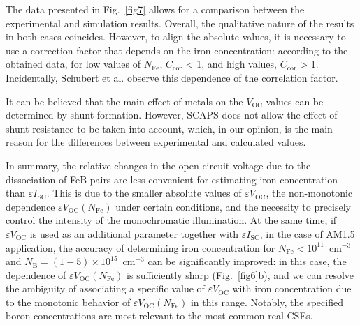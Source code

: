 \documentclass[a4paper,fleqn]{cas-sc}
\begin{document}
The data presented in Fig.~\ref{fig7} allows for a comparison between the experimental and simulation results. Overall, the qualitative nature of the results in both cases coincides. However, to align the absolute values, it is necessary to use a correction factor that depends on the iron concentration: according to the obtained data, for low values of $N_\mathrm{Fe}$, $C_\mathrm{cor}$ < 1, and high values, $C_\mathrm{cor}$ > 1. Incidentally, Schubert et al. \cite{IronSC} observe this dependence of the correlation factor.

It can be believed \cite{YangHandbookPVSi} that the main effect of metals on the $V_\mathrm{OC}$ values can be determined by shunt formation. However, SCAPS does not allow the effect of shunt resistance to be taken into account, which, in our opinion, is the main reason for the differences between experimental and calculated values.

In summary, the relative changes in the open-circuit voltage due to the dissociation of FeB pairs are less convenient for estimating iron concentration than $\varepsilon I_\mathrm{SC}$. This is due to the smaller absolute values of $\varepsilon V_\mathrm{OC}$, the non-monotonic dependence $\varepsilon V_\mathrm{OC}$$\left(N_\mathrm{Fe}\right)$ under certain conditions, and the necessity to precisely control the intensity of the monochromatic illumination. At the same time, if $\varepsilon V_\mathrm{OC}$ is used as an additional parameter together with $\varepsilon I_\mathrm{SC}$, in the case of AM1.5 application, the accuracy of determining iron concentration for $N_\mathrm{Fe}<10^{11}$~cm$^{-3}$ and $N_\mathrm{B}=(1-5)\times10^{15}$~cm$^{-3}$ can be significantly improved: in this case, the dependence of $\varepsilon V_\mathrm{OC}$$\left(N_\mathrm{Fe}\right)$ is sufficiently sharp (Fig.~\ref{fig6}b), and we can resolve the ambiguity of associating a specific value of $\varepsilon V_\mathrm{OC}$ with iron concentration due to the monotonic behavior of $\varepsilon V_\mathrm{OC}$$\left(N_\mathrm{Fe}\right)$ in this range. Notably, the specified boron concentrations are most relevant to the most common real CSEs.
\end{document}
